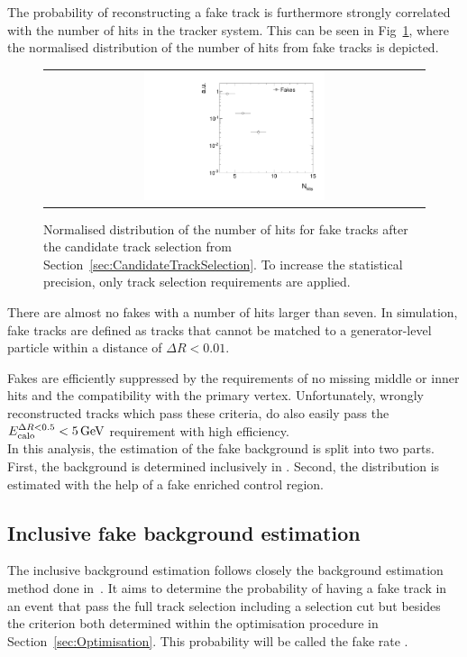 The probability of reconstructing a fake track is furthermore strongly correlated with the number of hits in the tracker system.
This can be seen in Fig~\ref{fig:NValidFakes}, where the normalised distribution of the number of hits from fake tracks is depicted.
\begin{figure}[!b]
  \centering 
  \begin{tabular}{c}
    \includegraphics[width=0.49\textwidth]{figures/analysis/Background/NValidForFakes_chiTracksfullSelectionNoTriggerCuts.pdf}
  \end{tabular}
  \caption{Normalised distribution of the number of hits for fake tracks after the candidate track selection from Section~\ref{sec:CandidateTrackSelection}.
           To increase the statistical precision, only track selection requirements are applied.}
  \label{fig:NValidFakes}
\end{figure}
There are almost no fakes with a number of hits larger than seven.
In simulation, fake tracks are defined as tracks that cannot be matched to a generator-level particle within a distance of $\Delta R < 0.01$.

Fakes are efficiently suppressed by the requirements of no missing middle or inner hits and the compatibility with the primary vertex.
Unfortunately, wrongly reconstructed tracks which pass these criteria, do also easily pass the $E^{\Delta R<0.5}_{\text{calo}}<5\,\text{Ge}\kern-0.06667em\text{V}$ requirement with high efficiency.\\

In this analysis, the estimation of the fake background is split into two parts.
First, the background is determined inclusively in \ias.
Second, the \ias distribution is estimated with the help of a fake enriched control region.

\subsection*{Inclusive fake background estimation}
The inclusive background estimation follows closely the background estimation method done in~\cite{bib:CMS:DT_Thesis,bib:CMS:DT_8TeV_AN}.
It aims to determine the probability of having a fake track in an event that pass the full track selection including a \pt selection cut but besides the \ias criterion both determined within the optimisation procedure in Section~\ref{sec:Optimisation}.
This probability will be called the fake rate \fakerate.

